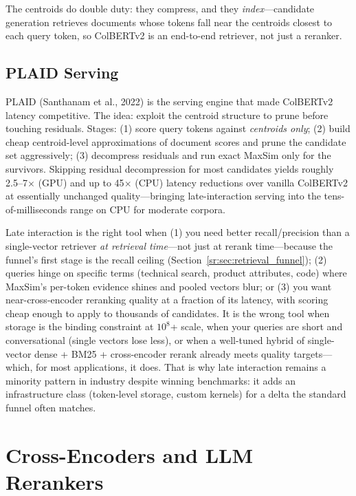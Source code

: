 The centroids do double duty: they compress, and they \textit{index}---candidate generation retrieves documents whose tokens fall near the centroids closest to each query token, so ColBERTv2 is an end-to-end retriever, not just a reranker.

\subsection{PLAID Serving}

PLAID (Santhanam et al., 2022) is the serving engine that made ColBERTv2 latency competitive. The idea: exploit the centroid structure to prune before touching residuals. Stages: (1) score query tokens against \textit{centroids only}; (2) build cheap centroid-level approximations of document scores and prune the candidate set aggressively; (3) decompress residuals and run exact MaxSim only for the survivors. Skipping residual decompression for most candidates yields roughly 2.5--7$\times$ (GPU) and up to 45$\times$ (CPU) latency reductions over vanilla ColBERTv2 at essentially unchanged quality---bringing late-interaction serving into the tens-of-milliseconds range on CPU for moderate corpora.

\begin{keyinsight}
Late interaction is the right tool when (1) you need better recall/precision than a single-vector retriever \textit{at retrieval time}---not just at rerank time---because the funnel's first stage is the recall ceiling (Section~\ref{sr:sec:retrieval_funnel}); (2) queries hinge on specific terms (technical search, product attributes, code) where MaxSim's per-token evidence shines and pooled vectors blur; or (3) you want near-cross-encoder reranking quality at a fraction of its latency, with scoring cheap enough to apply to thousands of candidates. It is the wrong tool when storage is the binding constraint at $10^8$+ scale, when your queries are short and conversational (single vectors lose less), or when a well-tuned hybrid of single-vector dense + BM25 + cross-encoder rerank already meets quality targets---which, for most applications, it does. That is why late interaction remains a minority pattern in industry despite winning benchmarks: it adds an infrastructure class (token-level storage, custom kernels) for a delta the standard funnel often matches.
\end{keyinsight}

\section{Cross-Encoders and LLM Rerankers}
\label{sr:sec:cross_encoders}


